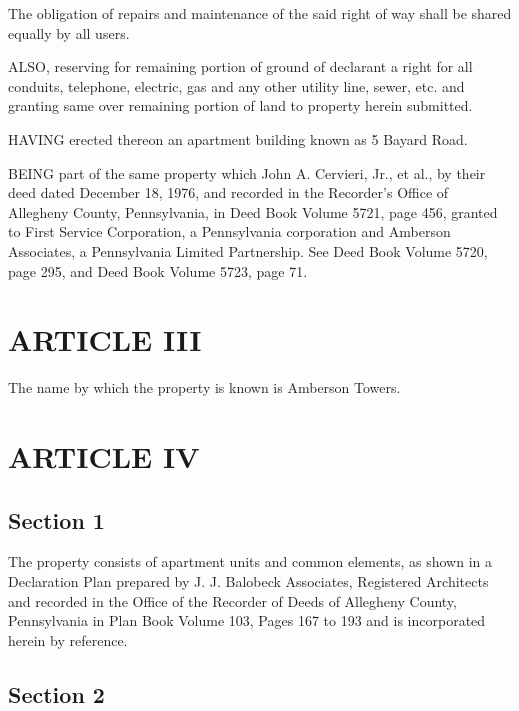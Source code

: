 \documentclass[
]{book}
\begin{document}
The obligation of repairs and maintenance of the said right of way shall be shared equally by all users.

ALSO, reserving for remaining portion of ground of declarant a right for all conduits, telephone, electric, gas and any other utility line, sewer, etc. and granting same over remaining portion of land to property herein submitted.

HAVING erected thereon an apartment building known as 5 Bayard Road.

BEING part of the same property which John A. Cervieri, Jr., et al., by their deed dated December 18, 1976, and recorded in the Recorder's Office of Allegheny County, Pennsylvania, in Deed Book Volume 5721, page 456, granted to First Service Corporation, a Pennsylvania corporation and Amberson Associates, a Pennsylvania Limited Partnership. See Deed Book Volume 5720, page 295, and Deed Book Volume 5723, page 71.

\hypertarget{article-iii}{%
\section*{ARTICLE III}\label{article-iii}}

The name by which the property is known is Amberson Towers.

\hypertarget{article-iv}{%
\section*{ARTICLE IV}\label{article-iv}}

\hypertarget{section-1}{%
\subsection*{Section 1}\label{section-1}}

The property consists of apartment units and common elements, as shown in a Declaration Plan prepared by J. J. Balobeck Associates, Registered Architects and recorded in the Office of the Recorder of Deeds of Allegheny County, Pennsylvania in Plan Book Volume 103, Pages 167 to 193 and is incorporated herein by reference.

\hypertarget{section-2}{%
\subsection*{Section 2}\label{section-2}}
\end{document}

